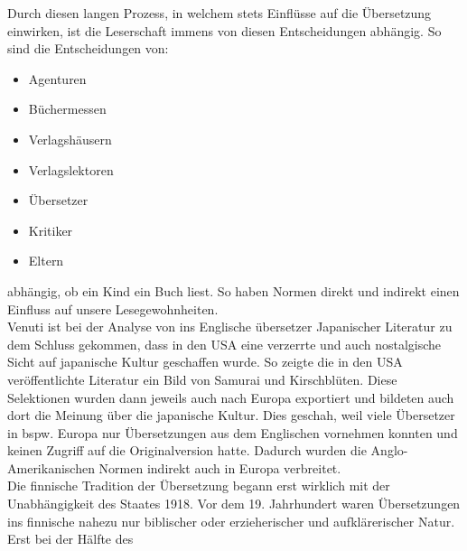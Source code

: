\documentclass{article}
\begin{document}
	Durch diesen langen Prozess, in welchem stets Einflüsse auf die Übersetzung einwirken, ist die Leserschaft immens von diesen Entscheidungen abhängig. So sind die Entscheidungen von:
	\begin{itemize}
		\item{Agenturen}
		\item{Büchermessen}
		\item{Verlagshäusern}
		\item{Verlagslektoren}
		\item{Übersetzer}
		\item{Kritiker}
		\item{Eltern}
	\end{itemize}
	abhängig, ob ein Kind ein Buch liest. So haben Normen direkt und indirekt einen Einfluss auf unsere Lesegewohnheiten. \\
	Venuti ist bei der Analyse von ins Englische übersetzer Japanischer Literatur zu dem Schluss gekommen, dass in den USA eine verzerrte und auch nostalgische Sicht auf japanische Kultur geschaffen wurde. So zeigte die in den USA veröffentlichte Literatur ein Bild von Samurai und Kirschblüten. Diese Selektionen wurden dann jeweils auch nach Europa exportiert und bildeten auch dort die Meinung über die japanische Kultur. Dies geschah, weil viele Übersetzer in bspw. Europa nur Übersetzungen aus dem Englischen vornehmen konnten und keinen Zugriff auf die Originalversion hatte. Dadurch wurden die Anglo-Amerikanischen Normen indirekt auch in Europa verbreitet.\\
	Die finnische Tradition der Übersetzung begann erst wirklich mit der Unabhängigkeit des Staates 1918. Vor dem 19. Jahrhundert waren Übersetzungen ins finnische nahezu nur biblischer oder erzieherischer und aufklärerischer Natur. Erst bei der Hälfte des

	


	
	


	



	   
























	
\end{document}
